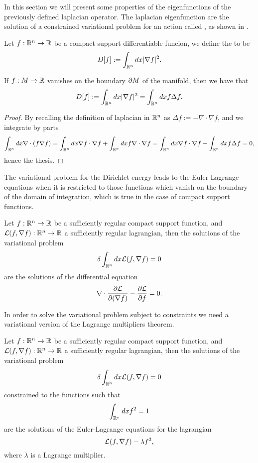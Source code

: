 \documentclass[../2.tex]{subfiles}
\begin{document}
In this section we will present some properties of the eigenfunctions of the previously defined laplacian operator.
The laplacian eigenfunction are the solution of a constrained variational problem for an action called , as shown in \cite{bronstein}.

\begin{defn}
    Let $f:\mathbb{R}^n \to \mathbb{R}$ be a compact support differentiable funcion, we define the  to be
    \[ D[f] := \int_{\mathbb{R}^n} dx |\nabla f|^2 .\]
\end{defn}

\begin{prop}
    If $f:M\to\mathbb{R}$ vanishes on the boundary $\partial M$ of the manifold, then we have that
    \[ D[f] := \int_{\mathbb{R}^n} dx |\nabla f|^2 = \int_{\mathbb{R}^n} dx f\Delta f .\]
\end{prop}
\begin{proof}
    By recalling the definition of laplacian in $\mathbb{R}^n$ as $\Delta f := -\nabla \cdot \nabla f$, and we integrate by parts
    \[ \int_{\mathbb{R}^n} dx \nabla \cdot (f \nabla f) = \int_{\mathbb{R}^n} dx \nabla f \cdot \nabla f + \int_{\mathbb{R}^n} dx f \nabla \cdot \nabla f = \int_{\mathbb{R}^n} dx \nabla f \cdot \nabla f - \int_{\mathbb{R}^n} dx f \Delta f = 0, \]
    hence the thesis. \qedhere
\end{proof}

The variational problem for the Dirichlet energy leads to the Euler-Lagrange equations when it is restricted to those functions which
vanish on the boundary of the domain of integration, which is true in the case of compact support functions.

\begin{prop}
    Let $f:\mathbb{R}^n \to \mathbb{R}$ be a sufficiently regular compact support function, and $\mathcal{L}(f,\nabla f) : \mathbb{R}^n \to \mathbb{R}$ a sufficiently regular lagrangian,
    then the solutions of the variational problem 
    \[ \delta\int_{\mathbb{R}^n} dx \mathcal{L}(f,\nabla f) = 0 \]
    are the solutions of the differential equation 
    \[ \nabla \cdot \frac{\partial \mathcal{L}}{\partial(\nabla f)} - \frac{\partial\mathcal{L}}{\partial f} = 0. \]
\end{prop}

In order to solve the variational problem subject to constraints we need a variational 
version of the Lagrange multipliers theorem.

\begin{prop}
    Let $f:\mathbb{R}^n \to \mathbb{R}$ be a sufficiently regular compact support function, and $\mathcal{L}(f,\nabla f) : \mathbb{R}^n \to \mathbb{R}$ a sufficiently regular lagrangian,
    then the solutions of the variational problem 
    \[ \delta\int_{\mathbb{R}^n} dx \mathcal{L}(f,\nabla f) = 0 \]
    constrained to the functions such that 
    \[ \int_{\mathbb{R}^n} dx f^2 = 1 \]
    are the solutions of the Euler-Lagrange equations for the lagrangian
    \[ \mathcal{L}(f,\nabla f) - \lambda f^2, \]
    where $\lambda$ is a Lagrange multiplier.
\end{prop}
\end{document}
